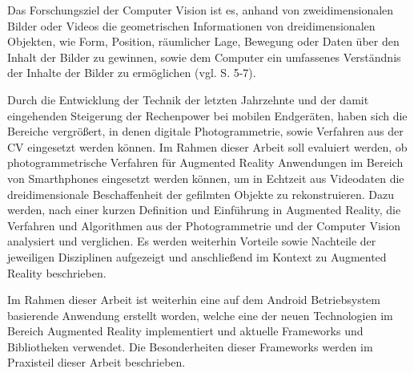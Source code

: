 Das Forschungsziel der Computer Vision ist es, anhand von zweidimensionalen Bilder oder Videos die geometrischen Informationen von dreidimensionalen Objekten, wie Form, Position, räumlicher Lage, Bewegung oder Daten über den Inhalt der Bilder zu gewinnen, sowie dem Computer ein umfassenes \glqq Verständnis\grqq{} der Inhalte der Bilder zu ermöglichen (vgl. \cite{photo} S. 5-7).

Durch die Entwicklung der Technik der letzten Jahrzehnte und der damit eingehenden Steigerung der Rechenpower bei mobilen Endgeräten, haben sich die Bereiche vergrößert, in denen digitale Photogrammetrie, sowie Verfahren aus der CV eingesetzt werden können. Im Rahmen dieser Arbeit soll evaluiert werden, ob photogrammetrische Verfahren für Augmented Reality Anwendungen im Bereich von Smarthphones eingesetzt werden können, um in Echtzeit aus Videodaten die dreidimensionale Beschaffenheit der gefilmten Objekte zu rekonstruieren. Dazu werden, nach einer kurzen Definition und Einführung in Augmented Reality, die Verfahren und Algorithmen aus der Photogrammetrie und der Computer Vision analysiert und verglichen. Es werden weiterhin Vorteile sowie Nachteile der jeweiligen Disziplinen aufgezeigt und anschließend im Kontext zu Augmented Reality beschrieben. 

Im Rahmen dieser Arbeit ist weiterhin eine auf dem Android Betriebsystem basierende Anwendung erstellt worden, welche eine der neuen Technologien im Bereich Augmented Reality implementiert und aktuelle Frameworks und Bibliotheken verwendet. Die Besonderheiten dieser Frameworks werden im Praxisteil dieser Arbeit beschrieben.



  


